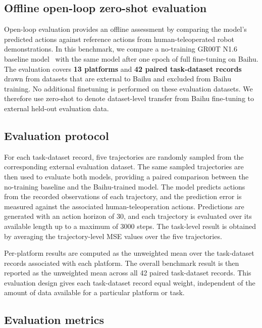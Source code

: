 \subsection{Offline open-loop zero-shot evaluation}

Open-loop evaluation provides an offline assessment by comparing the model's predicted actions against reference actions from human-teleoperated robot demonstrations. In this benchmark, we compare a no-training GR00T N1.6 baseline model~\cite{nvidia2025grootn1} with the same model after one epoch of full fine-tuning on Baihu. The evaluation covers \textbf{13 platforms} and \textbf{42 paired task-dataset records} drawn from datasets that are external to Baihu and excluded from Baihu training. No additional finetuning is performed on these evaluation datasets. We therefore use zero-shot to denote dataset-level transfer from Baihu fine-tuning to external held-out evaluation data.

\subsection{Evaluation protocol}

For each task-dataset record, five trajectories are randomly sampled from the corresponding external evaluation dataset. The same sampled trajectories are then used to evaluate both models, providing a paired comparison between the no-training baseline and the Baihu-trained model. The model predicts actions from the recorded observations of each trajectory, and the prediction error is measured against the associated human-teleoperation actions. Predictions are generated with an action horizon of 30, and each trajectory is evaluated over its available length up to a maximum of 3000 steps. The task-level result is obtained by averaging the trajectory-level MSE values over the five trajectories.

Per-platform results are computed as the unweighted mean over the task-dataset records associated with each platform. The overall benchmark result is then reported as the unweighted mean across all 42 paired task-dataset records. This evaluation design gives each task-dataset record equal weight, independent of the amount of data available for a particular platform or task.

\subsection{Evaluation metrics}

